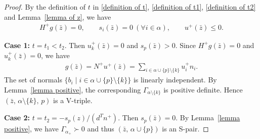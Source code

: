 \documentclass[10pt,a4paper]{amsart}
\begin{document}
	\begin{proof}
		By the definition of $t$ in \eqref{definition of t}, \eqref{definition of t1}, \eqref{definition of t2} and Lemma~\ref{lemma of z}, we have
		\begin{align*}
		H^{+} g(\bar{z}) = 0, \qquad
		s_{i}(\bar{z}) = 0~(\forall i \in \alpha), \qquad
		u^{+}(\bar{z}) \le 0.
		\end{align*}

		\noindent\textbf{Case 1:} $t = t_{1} < t_{2}$.  
		Then $u_{k}^{+}(\bar{z}) = 0$ and $s_{p}(\bar{z}) > 0$. Since $H^{+}g(\bar{z}) = 0$ and $u_{k}^{+}(\bar{z}) = 0$, we have
		\begin{align*}
		g(\bar{z}) = N^{+}u^{+}(\bar{z}) = 
		\sum_{i \in \alpha \cup \{p\} \setminus \{k\}} u_{i}^{+} n_{i}.
		\end{align*}
		The set of normals $\{ b_{i} \mid i \in \alpha \cup \{p\} \setminus \{k\} \}$ is linearly independent.  
		By Lemma~\ref{lemma positive}, the corresponding $\Gamma_{\alpha\setminus\{k\}}$ is positive definite. Hence $(\bar{z},\, \alpha \setminus \{k\},\, p)$ is a V-triple.
		
		\noindent\textbf{Case 2:} $t = t_{2} = -s_{p}(z)/(d^{T}n^{+})$.  
		Then $s_{p}(\bar{z}) = 0$.  
		By Lemma~\ref{lemma positive}, we have $\Gamma_{\alpha_{+}} \succ 0$ and thus $(\bar{z},\, \alpha \cup \{p\})$ is an S-pair.


\end{proof}
\end{document}
